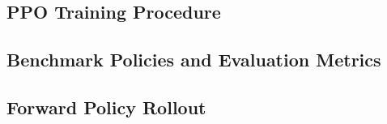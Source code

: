 \subsection{PPO Training Procedure}
\label{subsec:ppo_training}

\subsection{Benchmark Policies and Evaluation Metrics}
\label{subsec:benchmark_evaluation}

\subsection{Forward Policy Rollout}
\label{subsec:forward_policy_rollout}

